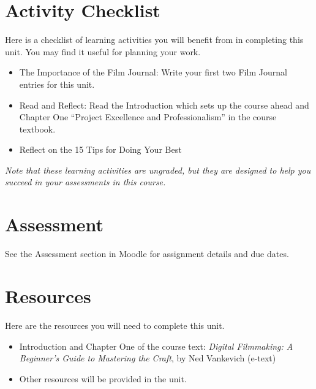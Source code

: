 \documentclass[
]{book}
\providecommand{\tightlist}{%
  \setlength{\itemsep}{0pt}\setlength{\parskip}{0pt}}
\begin{document}
\hypertarget{activity-checklist}{%
\section*{Activity Checklist}\label{activity-checklist}}

\begin{reflect}
Here is a checklist of learning activities you will benefit from in completing this unit. You may find it useful for planning your work.

\begin{itemize}
\tightlist
\item
  The Importance of the Film Journal: Write your first two Film Journal entries for this unit.
\item
  Read and Reflect: Read the Introduction which sets up the course ahead and Chapter One ``Project Excellence and Professionalism'' in the course textbook.
\item
  Reflect on the 15 Tips for Doing Your Best
\end{itemize}

\emph{Note that these learning activities are ungraded, but they are designed to help you succeed in your assessments in this course.}
\end{reflect}

\hypertarget{assessment}{%
\section*{Assessment}\label{assessment}}

See the Assessment section in Moodle for assignment details and due dates.

\hypertarget{resources}{%
\section*{Resources}\label{resources}}

Here are the resources you will need to complete this unit.

\begin{itemize}
\tightlist
\item
  Introduction and Chapter One of the course text: \emph{Digital Filmmaking: A Beginner's Guide to Mastering the Craft}, by Ned Vankevich (e-text)
\item
  Other resources will be provided in the unit.
\end{itemize}
\end{document}
